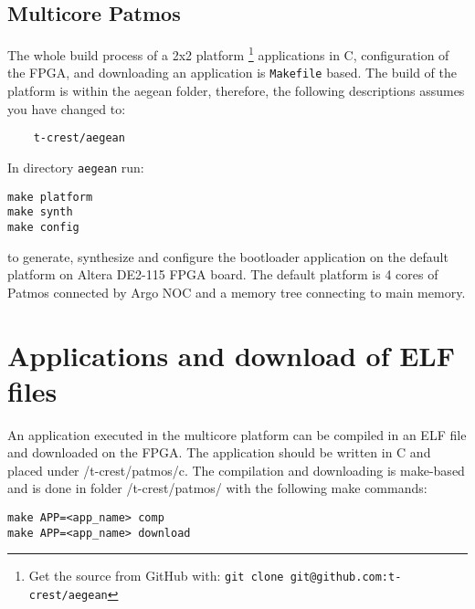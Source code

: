 \documentclass[a4paper,fontsize=10pt,twoside,DIV15,BCOR12mm,headinclude=true,footinclude=false,pagesize,bibtotoc]{scrbook}
\newcommand{\code}[1]{{\texttt{#1}}}
\begin{document}
\subsection{Multicore Patmos}

The whole build process of a 2x2 platform
\footnote{Get the source from GitHub with: \code{git clone git@github.com:t-crest/aegean}} 
applications %
in C, configuration of the FPGA, and downloading an application
is \code{Makefile} based. The build of the platform is within the aegean folder,
therefore, the following descriptions assumes you have changed to:

\begin{verbatim}
	t-crest/aegean
\end{verbatim}

In directory \code{aegean} run:

\begin{verbatim}
make platform
make synth
make config
\end{verbatim}

to generate, synthesize and configure the bootloader application on the default platform on Altera DE2-115 FPGA board. The default platform is 4 cores of Patmos connected by Argo NOC and a memory tree connecting to main memory.

\section{Applications and download of ELF files}

An application executed in the multicore platform can be compiled in an ELF file and downloaded on the FPGA.
The application should be written in C and placed under /t-crest/patmos/c. The compilation and downloading
is make-based and is done in folder /t-crest/patmos/ with the following make commands:

\begin{verbatim}
make APP=<app_name> comp
make APP=<app_name> download
\end{verbatim}
\end{document}

